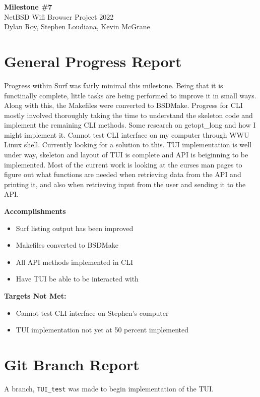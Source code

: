 \documentclass[11pt]{article}
\begin{document}
\begin{center}
  \textbf{\Large Milestone \#7}\\\large NetBSD Wifi Browser Project 2022\\
  Dylan Roy, Stephen Loudiana, Kevin McGrane
\end{center}

\section{General Progress Report}
Progress within Surf was fairly minimal this milestone. Being that it
is functinally complete, little tasks are being performed to improve
it in small ways. Along with this, the Makefiles were converted to BSDMake. 
Progress for CLI mostly involved thoroughly taking the time to understand 
the skeleton code and implement the remaining CLI methods. Some research on 
getopt\_long and how I might implement it. Cannot test CLI interface on my 
computer through WWU Linux shell. Currently looking for a solution to this. 
TUI implementation is well under way, skeleton and layout of TUI is complete 
and API is beiginning to be implemented. Most of the current work is looking
at the curses man pages to figure out what functions are needed when retrieving 
data from the API and printing it, and also when retrieving input from the user
and sending it to the API.

\textbf{Accomplishments}
\begin{itemize}
  \item Surf listing output has been improved 
  \item Makefiles converted to BSDMake
  \item All API methods implemented in CLI 
  \item Have TUI be able to be interacted with
\end{itemize}

\textbf{Targets Not Met:}
\begin{itemize}
  \item Cannot test CLI interface on Stephen's computer 
  \item TUI implementation not yet at 50 percent implemented
\end{itemize}


\section{Git Branch Report}
A branch, \texttt{TUI\_test} was made to begin implementation of the TUI.
\end{document}
